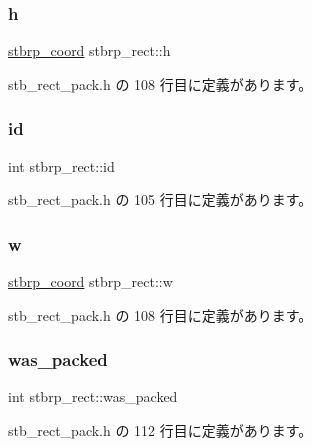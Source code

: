 \subsubsection{\texorpdfstring{h}{h}}
{\footnotesize\ttfamily \mbox{\hyperlink{stb__rect__pack_8h_ac2c2491b95dea6a298b7423dc762dfd9}{stbrp\+\_\+coord}} stbrp\+\_\+rect\+::h}



 stb\+\_\+rect\+\_\+pack.\+h の 108 行目に定義があります。

\mbox{\label{structstbrp__rect_a92da8626bc99df041c0c3bfd01c25f7a}} 
\subsubsection{\texorpdfstring{id}{id}}
{\footnotesize\ttfamily int stbrp\+\_\+rect\+::id}



 stb\+\_\+rect\+\_\+pack.\+h の 105 行目に定義があります。

\mbox{\label{structstbrp__rect_a248d43f1eb979c1e7b92ba6df431dec5}} 
\subsubsection{\texorpdfstring{w}{w}}
{\footnotesize\ttfamily \mbox{\hyperlink{stb__rect__pack_8h_ac2c2491b95dea6a298b7423dc762dfd9}{stbrp\+\_\+coord}} stbrp\+\_\+rect\+::w}



 stb\+\_\+rect\+\_\+pack.\+h の 108 行目に定義があります。

\mbox{\label{structstbrp__rect_a74ba347755ce17f2f8a2ea66c612af49}} 
\subsubsection{\texorpdfstring{was\+\_\+packed}{was\_packed}}
{\footnotesize\ttfamily int stbrp\+\_\+rect\+::was\+\_\+packed}



 stb\+\_\+rect\+\_\+pack.\+h の 112 行目に定義があります。


